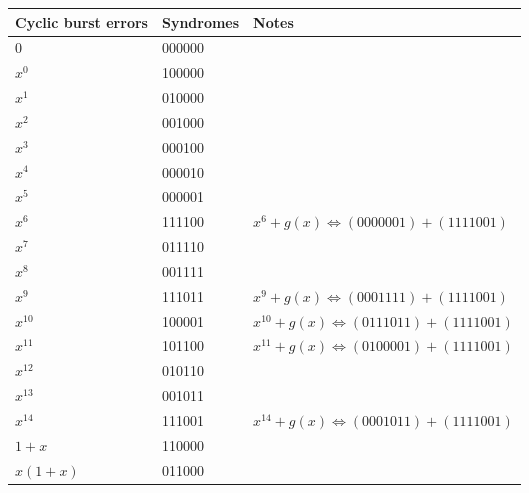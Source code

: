 \begin{table}[H]
    \centering
    \begin{tabularx}{\linewidth}{@{}YYY@{}}
        Cyclic burst errors & Syndromes  & Notes                                   \\
        \midrule
                           & 000000                                               \\
        \midrule
        $ x^0 $             & 100000                                               \\
        $ x^1 $             & 010000                                               \\
        $ x^2 $             & 001000                                               \\
        $ x^3 $             & 000100                                               \\
        $ x^4 $             & 000010                                               \\
        $ x^5 $             & 000001                                               \\
        $ x^6 $             & 111100     & $ x^6+g(x)\iff (0000001)+(1111001) $    \\
        $ x^7 $             & 011110                                               \\
        $ x^8 $             & 001111                                               \\
        $ x^9 $             & 111011     & $ x^9+g(x)\iff (0001111)+(1111001) $    \\
        $ x^{10} $          & 100001     & $ x^{10}+g(x)\iff (0111011)+(1111001) $ \\
        $ x^{11} $          & 101100     & $ x^{11}+g(x)\iff (0100001)+(1111001) $ \\
        $ x^{12} $          & 010110                                               \\
        $ x^{13} $          & 001011                                               \\
        $ x^{14} $          & 111001     & $ x^{14}+g(x)\iff (0001011)+(1111001) $ \\
        \midrule
        $ 1+x $             & 110000                                               \\
        $ x(1+x) $          & 011000                                               \\

\end{tabularx}
\end{table}
